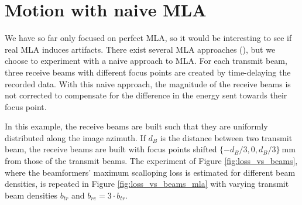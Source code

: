 
\section{Motion with naive MLA}
\label{sec:naive_mla}
We have so far only focused on perfect MLA, so it would be interesting to see if real MLA induces artifacts. There exist several MLA approaches (\cite{prb_approaches}), but we choose to experiment with a naive approach to MLA. For each transmit beam, three receive beams with different focus points are created by time-delaying the recorded data. With this naive approach, the magnitude of the receive beams is not corrected to compensate for the difference in the energy sent towards their focus point.

In this example, the receive beams are built such that they are uniformly distributed along the image azimuth. If $d_B$ is the distance between two transmit beam, the receive beams are built with focus points shifted $\{-d_B/3, 0, d_B/3\}~$mm from those of the transmit beams.
The experiment of Figure \ref{fig:loss_vs_beams}, where the beamformers' maximum scalloping loss is estimated for different beam densities, is repeated in Figure \ref{fig:loss_vs_beams_mla} with varying transmit beam densities $b_{tr}$ and $b_{re} = 3 \cdot b_{tr}$.
